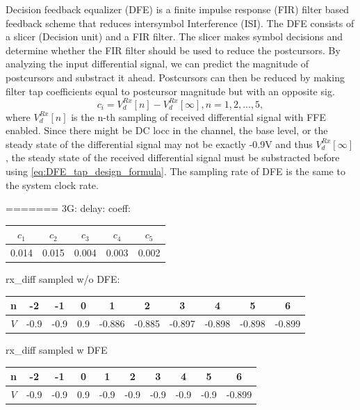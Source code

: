 \documentclass{book}  %
\renewcommand{\section}[1]{\psection{#1}}
\begin{document}
\begin{paper}
\section{Decision Feedback Equalizer}
Decision feedback equalizer (DFE) is a finite impulse response (FIR) filter based feedback scheme that reduces intersymbol Interference (ISI). The DFE consists of a slicer (Decision unit) and a FIR filter. The slicer makes symbol decisions and determine whether the FIR filter should be used to reduce the postcursors. By analyzing the input differential signal, we can predict the magnitude of postcursors and substract it ahead. Postcursors can then be reduced by making filter tap coefficients equal to postcursor magnitude but with an opposite sig. 
%
\begin{equation}
c_i = V_d^{Rx}[n] - V_d^{Rx}[\infty], n=1,2,...,5,
\label{eq:DFE_tap_design_formula}
\end{equation}
%
where $V_d^{Rx}[n]$ is the n-th sampling of received differential signal with FFE enabled. Since there might be DC locc in the channel, the base level, or the steady state of the differential signal may not be exactly -0.9V and thus $V_d^{Rx}[\infty]$, the steady state of the received differential signal must be substracted before using \ref{eq:DFE_tap_design_formula}. The sampling rate of DFE is the same to the system clock rate.

=======
3G:
delay: 
coeff:
\begin{tabular}{|c|c|c|c|c|}\hline
	$c_{1}$ &  $c_{2}$ &  $c_{3}$ &  $c_{4}$ &  $c_{5}$ \\ \hline 
	0.014 &    0.015 &    0.004 &    0.003 &    0.002 \\ \hline 
\end{tabular}

rx\_diff sampled w/o DFE:
\begin{tabular}{|c|c|c|c|c|c|c|c|c|c|}\hline
	n  &  -2  &  -1  &  0  &    1   &    2   &    3   &    4   &    5   &    6   \\ \hline 
	$V$ & -0.9 & -0.9 & 0.9 & -0.886 & -0.885 & -0.897 & -0.898 & -0.898 & -0.899 \\ \hline 
\end{tabular}

rx\_diff sampled w   DFE
\begin{tabular}{|c|c|c|c|c|c|c|c|c|c|}\hline
	n  &  -2  &  -1  &  0  &   1  &   2  &   3  &   4  &   5  &    6   \\ \hline 
	$V$ & -0.9 & -0.9 & 0.9 & -0.9 & -0.9 & -0.9 & -0.9 & -0.9 & -0.899 \\ \hline 
\end{tabular}



\end{paper}
\end{document}
